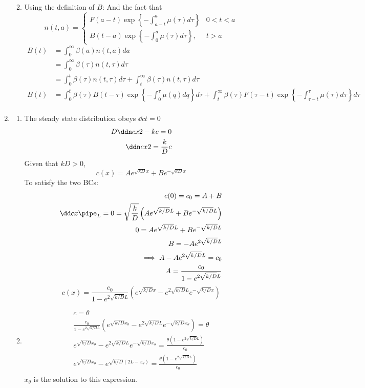 \documentclass{X:/Documents/Coding/Latex/myassignment}
\begin{document}
\begin{enumerate}
\begin{enumerate}
\begin{enumerate}
		\end{enumerate}
		\item Using the definition of $B$:
		And the fact that
		\[n(t,a) = \begin{cases}
			F(a-t) \exp\left\{-\int_{a-t}^a \mu(\tau) d \tau\right\} & 0<t < a\\
			B(t-a) \exp\left\{-\int_{0}^a \mu(\tau) d \tau\right\}, & t> a	
		\end{cases}\]
		\begin{align*}
			B(t) &= \int_0^\infty \beta(a) n(t,a) da\\
			&= \int_0^\infty \beta(\tau) n(t,\tau) d \tau\\
			&= \int_0^t \beta(\tau) n(t,\tau) d \tau + \int_t^\infty \beta(\tau) n(t,\tau) d \tau\\
			B(t) &= \int_0^t \beta(\tau) B(t- \tau) \exp\left\{-\int_{0}^\tau \mu(q) d q\right\} d \tau + \int_t^\infty  \beta(\tau)F(\tau-t) \exp\left\{-\int_{\tau - t}^\tau \mu(\tau) d \tau\right\}  d \tau \\
		\end{align*}
	\end{enumerate}

	\item 
	\begin{enumerate}
		\item 
		The steady state distribution obeys $\dd ct = 0$
		\begin{align*}
			D \ddn cx2 - kc = 0\\
			\ddn cx2 = \frac kD c
		\end{align*}
		Given that $kD > 0$, 
		\[c(x) = Ae^{\sqrt{kD} x} + Be^{-\sqrt{kD} x}\]
		To satisfy the two BCs:
		\begin{align*}
			c(0) = c_0 = A+B\\
			\dd cx\pipe_L = 0 = \sqrt{\frac{k}{D}}\left(Ae^{\sqrt{k/D} L} + Be^{-\sqrt{k/D} L}\right)\\
			0 = Ae^{\sqrt{k/D} L} + Be^{-\sqrt{k/D} L}\\
			B =- Ae^{2\sqrt{k/D} L}\\
			\implies A - Ae^{2\sqrt{k/D} L} = c_0\\
			A = \frac{c_0}{1 -e^{2\sqrt{k/D} L}}
		\end{align*}
		\[c(x) = \frac{c_0}{1 -e^{2\sqrt{k/D} L}} \left(e^{\sqrt{k/D} x} - e^{2\sqrt{k/D} L} e^{-\sqrt{k/D} x}\right) \]
		\item 
		\begin{align*}
			c = \theta\\
		\frac{c_0}{1 -e^{2\sqrt{k/D} L}} \left(e^{\sqrt{k/D} x_\theta} - e^{2\sqrt{k/D} L} e^{-\sqrt{k/D} x_\theta}\right) = \theta\\
		e^{\sqrt{k/D} x_\theta} - e^{2\sqrt{k/D} L} e^{-\sqrt{k/D} x_\theta} = \frac{\theta (1 -e^{2\sqrt{k/D} L})}{c_0}\\
		e^{\sqrt{k/D} x_\theta} - e^{\sqrt{k/D} (2L-x_\theta)} = \frac{\theta (1 -e^{2\sqrt{k/D} L})}{c_0}\\
		\end{align*}
		$x_\theta$ is the solution to this expression.


\end{enumerate}
\end{enumerate}
\end{document}
